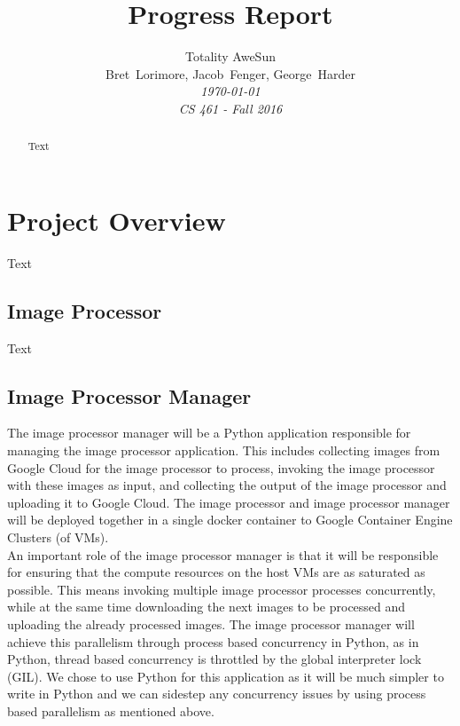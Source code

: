 \documentclass[10pt, onecolumn, draftclsnofoot, letterpaper, compsoc]{IEEEtran}
\title{Progress Report}
\author{Totality AweSun \\
		Bret~Lorimore, Jacob~Fenger, George~Harder \\
		\textit{\today \\
		CS 461 - Fall 2016}}
\begin{document}
\maketitle

\begin{abstract}

Text

\end{abstract}

\newpage

\tableofcontents

\newpage

\section{Project Overview}

Text

\subsection{Image Processor}

Text

\subsection{Image Processor Manager}

The image processor manager will be a Python application responsible for managing the image processor
application. This includes collecting images from Google Cloud for the image processor to process,
invoking the image processor with these images as input, and collecting the output of the image
processor and uploading it to Google Cloud. The image processor and image processor manager will be
deployed together in a single docker container to Google Container Engine Clusters (of VMs). \\

An important role of the image processor manager is that it will be responsible for ensuring that
the compute resources on the host VMs are as saturated as possible. This means invoking multiple
image processor processes concurrently, while at the same time downloading the next images to be
processed and uploading the already processed images. The image processor manager will achieve
this parallelism through process based concurrency in Python, as in Python, thread based concurrency
is throttled by the global interpreter lock (GIL). We chose to use Python for this application as it
will be much simpler to write in Python and we can sidestep any concurrency issues by using process
based parallelism as mentioned above. \\
\end{document}
